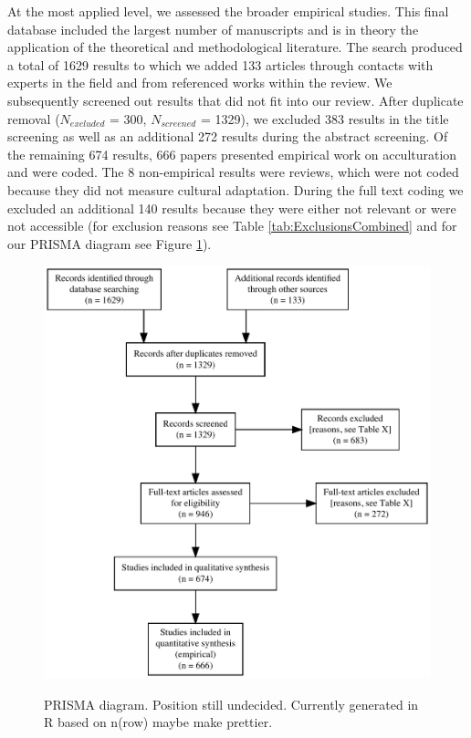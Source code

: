 At the most applied level, we assessed the broader empirical studies.
This final database included the largest number of manuscripts and is in
theory the application of the theoretical and methodological literature.
The search produced a total of 1629 results to which we added 133
articles through contacts with experts in the field and from referenced
works within the review. We subsequently screened out results that did
not fit into our review. After duplicate removal (\(N_{excluded}\) =
300, \(N_{screened}\) = 1329), we excluded 383 results in the title
screening as well as an additional 272 results during the abstract
screening. Of the remaining 674 results, 666 papers presented empirical
work on acculturation and were coded. The 8 non-empirical results were
reviews, which were not coded because they did not measure cultural
adaptation. During the full text coding we excluded an additional 140
results because they were either not relevant or were not accessible
(for exclusion reasons see Table \ref{tab:ExclusionsCombined} and for
our PRISMA diagram see Figure \ref{fig:PRISMA}).

\begin{figure}[h]
\centering
\caption{PRISMA diagram. Position still undecided. Currently generated in R based on n(row) maybe make prettier.}
\includegraphics[width=\textwidth]{Figures/PRISMA}
\label{fig:PRISMA}
\end{figure}


